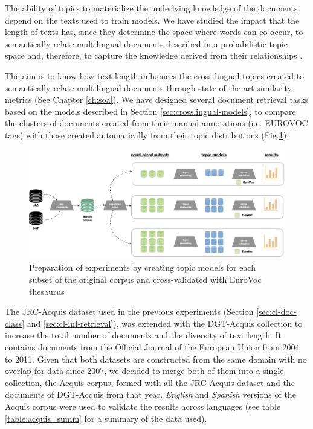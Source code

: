 The ability of topics to materialize the underlying knowledge of the documents depend on the texts used to train models. We have studied the impact that the length of texts has, since they determine the space where words can co-occur, to semantically relate multilingual documents described in a probabilistic topic space and, therefore, to capture the knowledge derived from their relationships \citep{Lozano2020}. 

The aim is to know how text length influences the cross-lingual topics created to semantically relate multilingual documents through state-of-the-art similarity metrics (See Chapter \ref{ch:soa}). We have designed several document retrieval tasks based on the models described in Section \ref{sec:crosslingual-models}, to compare the clusters of documents created from their manual annotations (i.e. EUROVOC tags) with those created automatically from their topic distributions (Fig.\ref{fig:workflow}). 

\begin{figure}[ht]
    \centering
    \includegraphics[width=1.0\linewidth]{workflow.png}
    \caption{Preparation of experiments by creating topic models for each \\subset of the original corpus and cross-validated with EuroVoc thesaurus}
    \label{fig:workflow}
\end{figure}


The JRC-Acquis dataset used in the previous experiments (Section \ref{sec:cl-doc-class} and \ref{sec:cl-inf-retrieval}), was extended with the DGT-Acquis \citep{Steinberger2014} collection to increase the total number of documents and the diversity of text length. It contains documents from the Official Journal of the European Union from 2004 to 2011. Given that both datasets are constructed from the same domain with no overlap for data since 2007, we decided to merge both of them into a single collection, the Acquis corpus, formed with all the JRC-Acquis dataset and the documents of DGT-Acquis from that year. \textit{English} and \textit{Spanish} versions of the Acquis corpus were used to validate the results across languages (see table \ref{table:acquis_summ} for a summary of the data used). 

